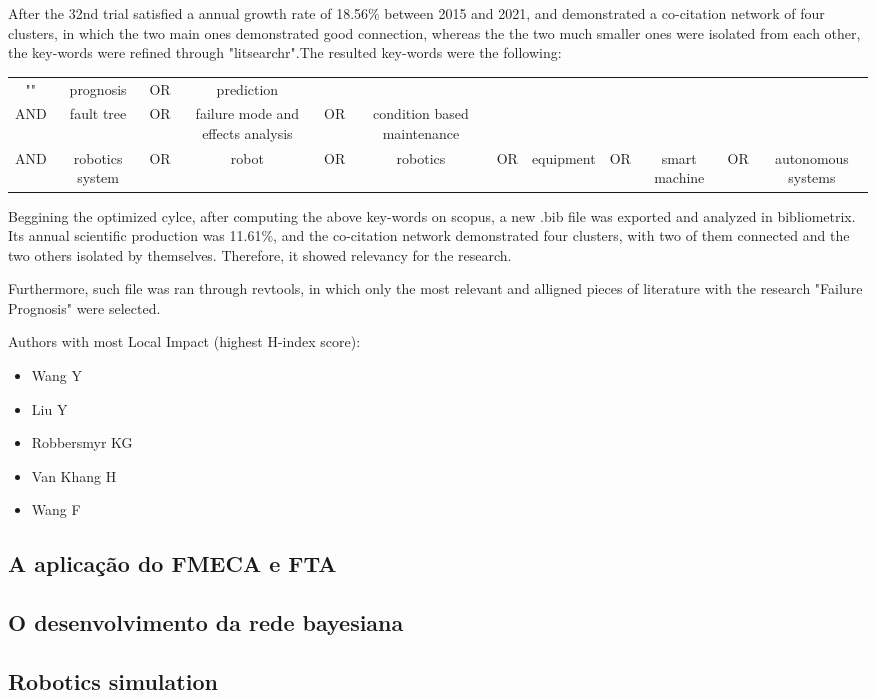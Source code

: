  After the 32nd trial satisfied a annual growth rate of 18.56\% between 2015 and 2021, and demonstrated a co-citation network of four clusters, in which the two main ones demonstrated good connection, whereas the the two much smaller ones were isolated from each other, the key-words were refined through "litsearchr".The resulted key-words were the following:

 \begin{center}
    \begin{tabular}{ c c c c c c c c c c c c }
        "" & prognosis & OR & prediction \\
        AND & fault tree & OR & failure mode and effects analysis & OR & condition based maintenance \\
        AND & robotics system & OR & robot & OR & robotics & OR &equipment & OR & smart machine & OR & autonomous systems
    \end{tabular}
\end{center}

Beggining the optimized cylce, after computing the above key-words on scopus, a new .bib file was exported and analyzed in bibliometrix. Its annual scientific production was 11.61\%, and the co-citation network demonstrated four clusters, with two of them connected and the two others isolated by themselves. Therefore, it showed relevancy for the research.

Furthermore, such file was ran through revtools, in which only the most relevant and alligned pieces of literature with the research "Failure Prognosis" were selected.


Authors with most Local Impact (highest H-index score):
\begin{itemize}
    \item Wang Y
    \item Liu Y
    \item Robbersmyr KG
    \item Van Khang H
    \item Wang F
\end{itemize}

\subsection{A aplicação do FMECA e FTA}

\subsection{O desenvolvimento da rede bayesiana}

\subsection{Robotics simulation}



